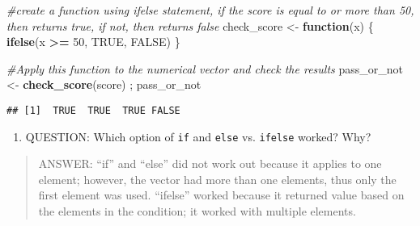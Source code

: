 \documentclass[]{article}
\newenvironment{Shaded}{\begin{snugshade}}{\end{snugshade}}
\newcommand{\KeywordTok}[1]{\textcolor[rgb]{0.13,0.29,0.53}{\textbf{#1}}}
\newcommand{\DecValTok}[1]{\textcolor[rgb]{0.00,0.00,0.81}{#1}}
\newcommand{\StringTok}[1]{\textcolor[rgb]{0.31,0.60,0.02}{#1}}
\newcommand{\CommentTok}[1]{\textcolor[rgb]{0.56,0.35,0.01}{\textit{#1}}}
\newcommand{\OtherTok}[1]{\textcolor[rgb]{0.56,0.35,0.01}{#1}}
\newcommand{\ControlFlowTok}[1]{\textcolor[rgb]{0.13,0.29,0.53}{\textbf{#1}}}
\newcommand{\OperatorTok}[1]{\textcolor[rgb]{0.81,0.36,0.00}{\textbf{#1}}}
\newcommand{\NormalTok}[1]{#1}
\providecommand{\tightlist}{%
  \setlength{\itemsep}{0pt}\setlength{\parskip}{0pt}}
\begin{document}
\begin{Shaded}
\begin{Highlighting}[]
\CommentTok{#create a function using ifelse statement, if the score is equal to or more than 50, then returns true, if not, then returns false}
\NormalTok{check_score <-}\StringTok{ }\ControlFlowTok{function}\NormalTok{(x) \{}
  \KeywordTok{ifelse}\NormalTok{(x }\OperatorTok{>=}\StringTok{ }\DecValTok{50}\NormalTok{, }\OtherTok{TRUE}\NormalTok{, }\OtherTok{FALSE}\NormalTok{)}
\NormalTok{\}}

\CommentTok{#Apply this function to the numerical vector and check the results}
\NormalTok{pass_or_not <-}\StringTok{ }\KeywordTok{check_score}\NormalTok{(score) ; pass_or_not}
\end{Highlighting}
\end{Shaded}

\begin{verbatim}
## [1]  TRUE  TRUE  TRUE FALSE
\end{verbatim}

\begin{enumerate}
\def\labelenumi{\arabic{enumi}.}
\setcounter{enumi}{11}
\tightlist
\item
  QUESTION: Which option of \texttt{if} and \texttt{else} vs.
  \texttt{ifelse} worked? Why?
\end{enumerate}

\begin{quote}
ANSWER: ``if'' and ``else'' did not work out because it applies to one
element; however, the vector had more than one elements, thus only the
first element was used. ``ifelse'' worked because it returned value
based on the elements in the condition; it worked with multiple
elements.
\end{quote}
\end{document}
